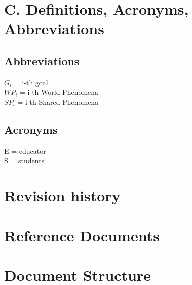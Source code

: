\section{C. Definitions, Acronyms, Abbreviations}
\subsection{Abbreviations}
\(G_i\) = i-th goal \\
\(WP_i\) = i-th World Phenomena\\
\(SP_i\) = i-th Shared Phenomena\\

\subsection{Acronyms}
E = educator \\
S = students
\section{Revision history}
\section{Reference Documents}
\section{Document Structure}